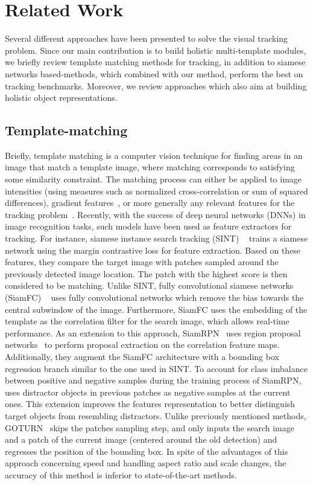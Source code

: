 \documentclass{article}
\begin{document}
\section{Related Work}
Several different approaches have been presented to solve the visual tracking problem. Since our main contribution is to build holistic multi-template modules, we briefly review template matching methods for tracking, in addition to siamese networks based-methods, which combined with our method, perform the best on tracking benchmarks. Moreover, we review approaches which also aim at building holistic object representations.

\subsection{Template-matching}
Briefly, template matching is a computer vision technique for finding areas in an image that match a template image, where matching corresponds to satisfying some similarity constraint. The matching process can either be applied to image intensities (using measures such as normalized cross-correlation or sum of squared differences), gradient features~\cite{mohr2009continuous}, or more generally any relevant features for the tracking problem~\cite{olson1997automatic,steger2002occlusion,hofhauser2008edge}. Recently, with the success of deep neural networks (DNNs) in image recognition tasks, such models have been used as feature extractors for tracking. For instance, siamese instance search tracking (SINT) ~\cite{tao2016siamese} trains a siamese network using the margin contrastive loss for feature extraction. Based on these features, they compare the target image with patches sampled around the previously detected image location. The patch with the highest score is then considered to be matching. Unlike SINT, fully convolutional siamese networks (SiamFC) ~\cite{bertinetto2016fully} uses fully convolutional networks which remove the bias towards the central subwindow of the image. Furthermore, SiamFC uses the embedding of the template as the correlation filter for the search image, which allows real-time performance. As an extension to this approach, SiamRPN~\cite{li2018high} uses region proposal networks~\cite{ren2015faster} to perform proposal extraction on the correlation feature maps. Additionally, they augment the SiamFC architecture with a bounding box regression branch similar to the one used in SINT. To account for class imbalance between positive and negative samples during the training process of SiamRPN, ~\cite{zhu2018distractor} uses distractor objects in previous patches as negative samples at the current ones. This extension improves the features representation to better distinguish target objects from resembling distractors. Unlike previously mentioned methods, GOTURN~\cite{held2016learning} skips the patches sampling step, and only inputs the search image and a patch of the current image (centered around the old detection) and regresses the position of the bounding box. In spite of the advantages of this approach concerning speed and handling aspect ratio and scale changes, the accuracy of this method is inferior to state-of-the-art methods.
\end{document}

